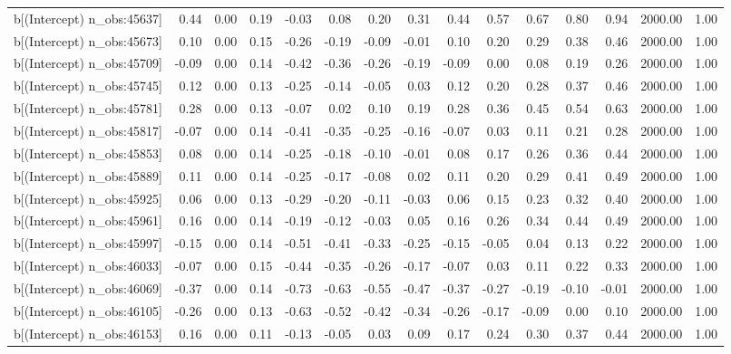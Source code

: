 \begin{table}[ht]
\begin{tabular}{rrrrrrrrrrrrrrr}
  b[(Intercept) n\_obs:45637] & 0.44 & 0.00 & 0.19 & -0.03 & 0.08 & 0.20 & 0.31 & 0.44 & 0.57 & 0.67 & 0.80 & 0.94 & 2000.00 & 1.00 \\ 
  b[(Intercept) n\_obs:45673] & 0.10 & 0.00 & 0.15 & -0.26 & -0.19 & -0.09 & -0.01 & 0.10 & 0.20 & 0.29 & 0.38 & 0.46 & 2000.00 & 1.00 \\ 
  b[(Intercept) n\_obs:45709] & -0.09 & 0.00 & 0.14 & -0.42 & -0.36 & -0.26 & -0.19 & -0.09 & 0.00 & 0.08 & 0.19 & 0.26 & 2000.00 & 1.00 \\ 
  b[(Intercept) n\_obs:45745] & 0.12 & 0.00 & 0.13 & -0.25 & -0.14 & -0.05 & 0.03 & 0.12 & 0.20 & 0.28 & 0.37 & 0.46 & 2000.00 & 1.00 \\ 
  b[(Intercept) n\_obs:45781] & 0.28 & 0.00 & 0.13 & -0.07 & 0.02 & 0.10 & 0.19 & 0.28 & 0.36 & 0.45 & 0.54 & 0.63 & 2000.00 & 1.00 \\ 
  b[(Intercept) n\_obs:45817] & -0.07 & 0.00 & 0.14 & -0.41 & -0.35 & -0.25 & -0.16 & -0.07 & 0.03 & 0.11 & 0.21 & 0.28 & 2000.00 & 1.00 \\ 
  b[(Intercept) n\_obs:45853] & 0.08 & 0.00 & 0.14 & -0.25 & -0.18 & -0.10 & -0.01 & 0.08 & 0.17 & 0.26 & 0.36 & 0.44 & 2000.00 & 1.00 \\ 
  b[(Intercept) n\_obs:45889] & 0.11 & 0.00 & 0.14 & -0.25 & -0.17 & -0.08 & 0.02 & 0.11 & 0.20 & 0.29 & 0.41 & 0.49 & 2000.00 & 1.00 \\ 
  b[(Intercept) n\_obs:45925] & 0.06 & 0.00 & 0.13 & -0.29 & -0.20 & -0.11 & -0.03 & 0.06 & 0.15 & 0.23 & 0.32 & 0.40 & 2000.00 & 1.00 \\ 
  b[(Intercept) n\_obs:45961] & 0.16 & 0.00 & 0.14 & -0.19 & -0.12 & -0.03 & 0.05 & 0.16 & 0.26 & 0.34 & 0.44 & 0.49 & 2000.00 & 1.00 \\ 
  b[(Intercept) n\_obs:45997] & -0.15 & 0.00 & 0.14 & -0.51 & -0.41 & -0.33 & -0.25 & -0.15 & -0.05 & 0.04 & 0.13 & 0.22 & 2000.00 & 1.00 \\ 
  b[(Intercept) n\_obs:46033] & -0.07 & 0.00 & 0.15 & -0.44 & -0.35 & -0.26 & -0.17 & -0.07 & 0.03 & 0.11 & 0.22 & 0.33 & 2000.00 & 1.00 \\ 
  b[(Intercept) n\_obs:46069] & -0.37 & 0.00 & 0.14 & -0.73 & -0.63 & -0.55 & -0.47 & -0.37 & -0.27 & -0.19 & -0.10 & -0.01 & 2000.00 & 1.00 \\ 
  b[(Intercept) n\_obs:46105] & -0.26 & 0.00 & 0.13 & -0.63 & -0.52 & -0.42 & -0.34 & -0.26 & -0.17 & -0.09 & 0.00 & 0.10 & 2000.00 & 1.00 \\ 
  b[(Intercept) n\_obs:46153] & 0.16 & 0.00 & 0.11 & -0.13 & -0.05 & 0.03 & 0.09 & 0.17 & 0.24 & 0.30 & 0.37 & 0.44 & 2000.00 & 1.00 \\ 

\end{tabular}
\end{table}
